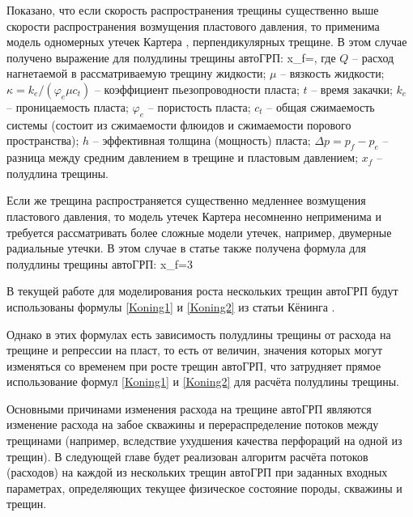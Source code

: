 Показано, что если скорость распространения трещины существенно выше скорости распространения возмущения пластового давления, то применима модель одномерных утечек Картера \cite{karter}, перпендикулярных трещине.
В этом случае получено выражение для полудлины трещины автоГРП:
\beq\label{Koning1}
x_{\!f}=,
\eeq
где $Q$ -- расход нагнетаемой в рассматриваемую трещину жидкости;
$\mu$ -- вязкость жидкости;
$\kappa=k_e/(\varphi_e\mu c_t)$ -- коэффициент пьезопроводности пласта;
$t$ -- время закачки;
$k_e$ -- проницаемость пласта;
$\varphi_e$ -- пористость пласта;
$c_t$ -- общая сжимаемость системы (состоит из сжимаемости флюидов и сжимаемости порового пространства);
$h$ -- эффективная толщина (мощность) пласта;
$\Delta p=p_{\!f}-p_e$ -- разница между средним давлением в трещине и пластовым давлением; $x_f$ -- полудлина трещины.

Если же трещина распространяется существенно медленнее возмущения пластового давления, то модель утечек Картера несомненно неприменима и требуется рассматривать более сложные модели утечек, например, двумерные радиальные утечки.
В этом случае в статье \cite{koning} также получена формула для полудлины трещины автоГРП:
\beq\label{Koning2}
x_{\!f}=3
\eeq

В текущей работе для моделирования роста нескольких трещин автоГРП будут использованы формулы \eqref{Koning1} и \eqref{Koning2} из статьи Кёнинга \cite{koning}.

Однако в этих формулах есть зависимость полудлины трещины от расхода на трещине и репрессии на пласт, то есть от величин, значения которых могут изменяться со временем при росте трещин автоГРП, что затрудняет прямое использование формул \eqref{Koning1} и \eqref{Koning2} для расчёта полудлины трещины.

Основными причинами изменения расхода на трещине автоГРП являются изменение расхода на забое скважины и перераспределение потоков между трещинами (например, вследствие ухудшения качества перфораций на одной из трещин).
В следующей главе будет реализован алгоритм расчёта потоков (расходов) на каждой из нескольких трещин автоГРП при заданных входных параметрах, определяющих текущее физическое состояние породы, скважины и трещин.




